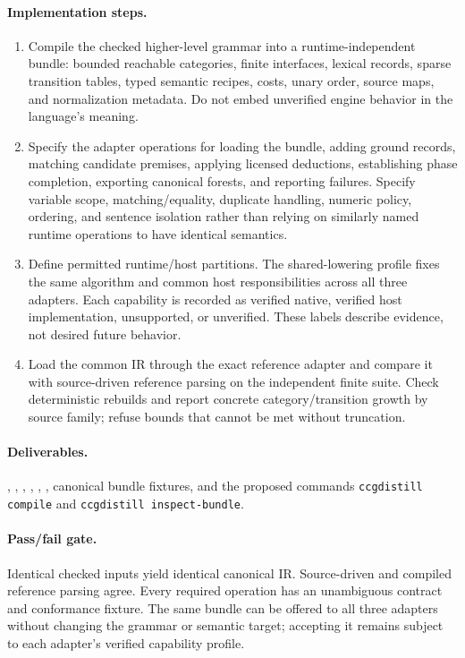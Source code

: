 \documentclass[11pt,a4paper]{article}
\begin{document}
\paragraph{Implementation steps.}
\begin{enumerate}
\item Compile the checked higher-level grammar into a runtime-independent
bundle: bounded reachable categories, finite interfaces, lexical records,
sparse transition tables, typed semantic recipes, costs, unary order, source
maps, and normalization metadata. Do not embed unverified engine behavior in
the language's meaning.
\item Specify the adapter operations for loading the bundle, adding ground
records, matching candidate premises, applying licensed deductions,
establishing phase completion, exporting canonical forests, and reporting
failures. Specify variable scope, matching/equality, duplicate handling,
numeric policy, ordering, and sentence isolation rather than relying on
similarly named runtime operations to have identical semantics.
\item Define permitted runtime/host partitions. The shared-lowering profile
fixes the same algorithm and common host responsibilities across all three
adapters. Each capability is recorded as verified native, verified host
implementation, unsupported, or unverified. These labels describe evidence,
not desired future behavior.
\item Load the common IR through the exact reference adapter and compare it
with source-driven reference parsing on the independent finite suite.
Check deterministic rebuilds and report concrete category/transition growth
by source family; refuse bounds that cannot be met without truncation.
\end{enumerate}

\paragraph{Deliverables.} ,
, ,
, ,
, canonical bundle fixtures, and the proposed
commands \texttt{ccgdistill compile} and \texttt{ccgdistill inspect-bundle}.

\paragraph{Pass/fail gate.} Identical checked inputs yield identical canonical
IR. Source-driven and compiled reference parsing agree. Every required
operation has an unambiguous contract and conformance fixture. The same
bundle can be offered to all three adapters without changing the grammar or
semantic target; accepting it remains subject to each adapter's verified
capability profile.
\end{document}
